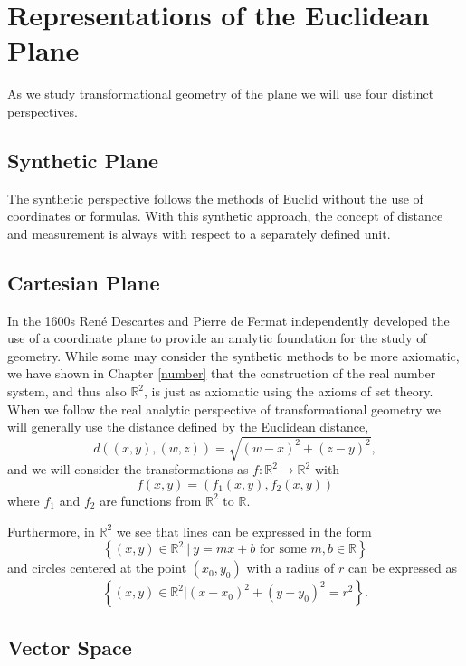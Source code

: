 \documentclass[
]{book}
\theoremstyle{definition}
\theoremstyle{definition}
\theoremstyle{definition}
\theoremstyle{definition}
\theoremstyle{remark}
\begin{document}
\hypertarget{representations-of-the-euclidean-plane}{%
\section{Representations of the Euclidean Plane}\label{representations-of-the-euclidean-plane}}

As we study transformational geometry of the plane we will use four distinct perspectives.

\hypertarget{synthetic-plane}{%
\subsection{Synthetic Plane}\label{synthetic-plane}}

The synthetic perspective follows the methods of Euclid without the use of coordinates or formulas. With this synthetic approach, the concept of distance and measurement is always with respect to a separately defined unit.

\hypertarget{cartesian-plane}{%
\subsection{Cartesian Plane}\label{cartesian-plane}}

In the 1600s René Descartes and Pierre de Fermat independently developed the use of a coordinate plane to provide an analytic foundation for the study of geometry. While some may consider the synthetic methods to be more axiomatic, we have shown in Chapter \ref{number} that the construction of the real number system, and thus also \(\mathbb{R}^2\), is just as axiomatic using the axioms of set theory. When we follow the real analytic perspective of transformational geometry we will generally use the distance defined by the Euclidean distance, \[d\left( (x,y),(w,z)\right) = \sqrt{(w-x)^2+(z-y)^2},\] and we will consider the transformations as
\(f:\mathbb{R}^2 \rightarrow \mathbb{R}^2\) with \[f(x,y)= \left( f_1(x,y), f_2(x,y)\right)\] where \(f_1\) and \(f_2\) are functions from \(\mathbb{R}^2\) to \(\mathbb{R}\).

Furthermore, in \(\mathbb{R}^2\) we see that lines can be expressed in the form \[\left\{ (x,y) \in \mathbb{R}^2 \: \vert \: y=mx+b \mbox{ for some } m,b\in \mathbb{R}\right\}\] and circles centered at the point \((x_0,y_0)\) with a radius of \(r\) can be expressed as \[\left\{ (x,y)\in \mathbb{R}^2 \vert (x-x_0)^2 + (y-y_0)^2 = r^2\right\}.\]

\hypertarget{vector-space}{%
\subsection{Vector Space}\label{vector-space}}
\end{document}
